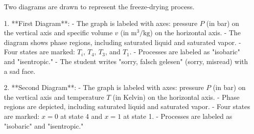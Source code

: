 Two diagrams are drawn to represent the freeze-drying process.  

1. **First Diagram**:  
   - The graph is labeled with axes: pressure \( P \) (in bar) on the vertical axis and specific volume \( v \) (in \( \text{m}^3/\text{kg} \)) on the horizontal axis.  
   - The diagram shows phase regions, including saturated liquid and saturated vapor.  
   - Four states are marked: \( T_i \), \( T_4 \), \( T_3 \), and \( T_1 \).  
   - Processes are labeled as "isobaric" and "isentropic."  
   - The student writes "sorry, falsch gelesen" (sorry, misread) with a sad face.  

2. **Second Diagram**:  
   - The graph is labeled with axes: pressure \( P \) (in bar) on the vertical axis and temperature \( T \) (in Kelvin) on the horizontal axis.  
   - Phase regions are depicted, including saturated liquid and saturated vapor.  
   - Four states are marked: \( x = 0 \) at state 4 and \( x = 1 \) at state 1.  
   - Processes are labeled as "isobaric" and "isentropic."